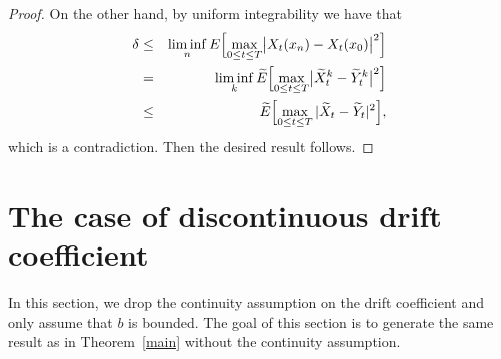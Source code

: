 \documentclass[numbers,compress,v1.0.1]{vmsta}
\theoremstyle{definition}
\newcommand{\rrvert}{\vert}
\newcommand{\llvert}{\vert}
\begin{document}
\begin{proof}
On the other hand, by uniform integrability we have that
%
\begin{eqnarray*}
\delta&\leq& \liminf_n E \Bigl[\max_{0\leq t\leq T}
\bigl\llvert X_t (x_n)-X_t (x_0)
\bigr\rrvert ^{2} \Bigr]
\\
&=&\liminf_k \widetilde{E} \Bigl[\max_{0\leq t\leq T}
\bigl\llvert \widetilde {X}^{k}_t-\widetilde{Y}^{k}_t
\bigr\rrvert ^{2} \Bigr]
\\
&\leq& \widetilde{E} \Bigl[\max_{0\leq t\leq T}\llvert \widetilde
{X}_t-\widetilde{Y}_t\rrvert ^{2} \Bigr],
\end{eqnarray*}
%
which is a contradiction. Then the desired result follows.
\end{proof}
%
\section{The case of discontinuous drift coefficient}
In this section, we drop the continuity assumption on the drift
coefficient and only assume that $b$ is bounded. The goal of this
section is to generate the same result as in Theorem~\ref{main} without
the continuity assumption.
\end{document}
